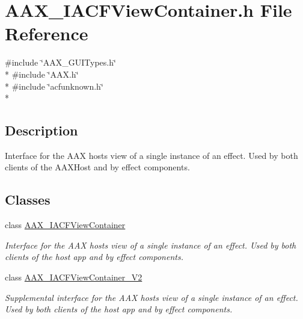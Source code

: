 \hypertarget{a00234}{}\section{A\+A\+X\+\_\+\+I\+A\+C\+F\+View\+Container.\+h File Reference}
\label{a00234}
{\ttfamily \#include \char`\"{}A\+A\+X\+\_\+\+G\+U\+I\+Types.\+h\char`\"{}}\\*
{\ttfamily \#include \char`\"{}A\+A\+X.\+h\char`\"{}}\\*
{\ttfamily \#include \char`\"{}acfunknown.\+h\char`\"{}}\\*


\subsection{Description}
Interface for the A\+A\+X host\textquotesingle{}s view of a single instance of an effect. Used by both clients of the A\+A\+X\+Host and by effect components. 

\subsection*{Classes}
\begin{DoxyCompactItemize}
\item 
class \hyperlink{a00084}{A\+A\+X\+\_\+\+I\+A\+C\+F\+View\+Container}
\begin{DoxyCompactList}\small\item\em Interface for the A\+A\+X host\textquotesingle{}s view of a single instance of an effect. Used by both clients of the host app and by effect components. \end{DoxyCompactList}\item 
class \hyperlink{a00085}{A\+A\+X\+\_\+\+I\+A\+C\+F\+View\+Container\+\_\+\+V2}
\begin{DoxyCompactList}\small\item\em Supplemental interface for the A\+A\+X host\textquotesingle{}s view of a single instance of an effect. Used by both clients of the host app and by effect components. \end{DoxyCompactList}\end{DoxyCompactItemize}
